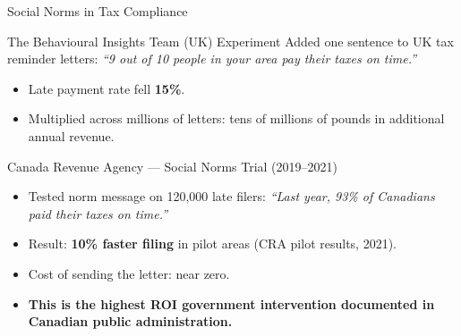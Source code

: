 \documentclass[aspectratio=169]{beamer}
\begin{document}
\begin{frame}{Social Norms in Tax Compliance}
\begin{block}{The Behavioural Insights Team (UK) Experiment}
Added one sentence to UK tax reminder letters: \textit{``9 out of 10 people in your area pay their taxes on time.''}
\begin{itemize}
  \item Late payment rate fell \textbf{15\%}.
  \item Multiplied across millions of letters: tens of millions of pounds in additional annual revenue.
\end{itemize}
\end{block}
\begin{exampleblock}{Canada Revenue Agency --- Social Norms Trial (2019--2021)}
\begin{itemize}
  \item Tested norm message on 120,000 late filers: \textit{``Last year, 93\% of Canadians paid their taxes on time.''}
  \item Result: \textbf{10\% faster filing} in pilot areas (CRA pilot results, 2021).
  \item Cost of sending the letter: near zero.
  \item \textbf{This is the highest ROI government intervention documented in Canadian public administration.}
\end{itemize}
\end{exampleblock}
\end{frame}
\end{document}
